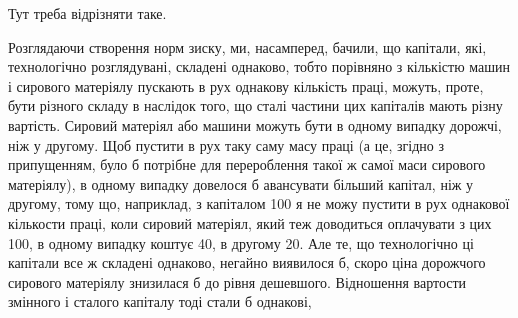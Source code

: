 Тут треба відрізняти таке.

Розглядаючи створення норм зиску, ми, насамперед, бачили, що капітали,
які, технологічно розглядувані, складені однаково, тобто порівняно з кількістю
машин і сирового матеріялу пускають в рух однакову кількість праці,
можуть, проте, бути різного складу в наслідок того, що сталі частини цих капіталів
мають різну вартість. Сировий матеріял або машини можуть бути в
одному випадку дорожчі, ніж у другому. Щоб пустити в рух таку саму масу
праці (а це, згідно з припущенням, було б потрібне для перероблення такої ж
самої маси сирового матеріялу), в одному випадку довелося б авансувати більший
капітал, ніж у другому, тому що, наприклад, з капіталом 100 я не можу пустити
в рух однакової кількости праці, коли сировий матеріял, який теж доводиться
оплачувати з цих 100, в одному випадку коштує 40, в другому 20.
Але те, що технологічно ці капітали все ж складені однаково, негайно виявилося
б, скоро ціна дорожчого сирового матеріялу знизилася б до рівня дешевшого.
Відношення вартости змінного і сталого капіталу тоді стали б однакові,
\parbreak{}  %
